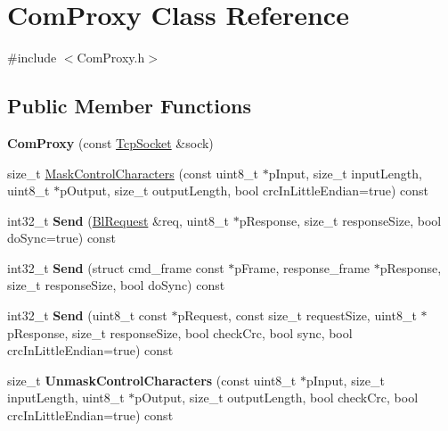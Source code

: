 \hypertarget{class_com_proxy}{\section{Com\-Proxy Class Reference}
\label{class_com_proxy}
}


{\ttfamily \#include $<$Com\-Proxy.\-h$>$}

\subsection*{Public Member Functions}
\begin{DoxyCompactItemize}
\item 
\hypertarget{class_com_proxy_a71069fbcb6901649f75f7b816559e061}{{\bfseries Com\-Proxy} (const \hyperlink{class_tcp_socket}{Tcp\-Socket} \&sock)}\label{class_com_proxy_a71069fbcb6901649f75f7b816559e061}

\item 
size\-\_\-t \hyperlink{class_com_proxy_ada3a89b37980a3e14d3f76341db0c78e}{Mask\-Control\-Characters} (const uint8\-\_\-t $\ast$p\-Input, size\-\_\-t input\-Length, uint8\-\_\-t $\ast$p\-Output, size\-\_\-t output\-Length, bool crc\-In\-Little\-Endian=true) const 
\item 
\hypertarget{class_com_proxy_a58c03dfa5d87cbad6ce77257c5195eb4}{int32\-\_\-t {\bfseries Send} (\hyperlink{struct_bl_request}{Bl\-Request} \&req, uint8\-\_\-t $\ast$p\-Response, size\-\_\-t response\-Size, bool do\-Sync=true) const }\label{class_com_proxy_a58c03dfa5d87cbad6ce77257c5195eb4}

\item 
\hypertarget{class_com_proxy_ab6205e7b4fbfcce8066e3019f5b52fb0}{int32\-\_\-t {\bfseries Send} (struct cmd\-\_\-frame const $\ast$p\-Frame, response\-\_\-frame $\ast$p\-Response, size\-\_\-t response\-Size, bool do\-Sync) const }\label{class_com_proxy_ab6205e7b4fbfcce8066e3019f5b52fb0}

\item 
\hypertarget{class_com_proxy_a5d07c1c822e4ce825236900a6b15e020}{int32\-\_\-t {\bfseries Send} (uint8\-\_\-t const $\ast$p\-Request, const size\-\_\-t request\-Size, uint8\-\_\-t $\ast$p\-Response, size\-\_\-t response\-Size, bool check\-Crc, bool sync, bool crc\-In\-Little\-Endian=true) const }\label{class_com_proxy_a5d07c1c822e4ce825236900a6b15e020}

\item 
\hypertarget{class_com_proxy_a533dbda1e24b846609c153c7545baba0}{size\-\_\-t {\bfseries Unmask\-Control\-Characters} (const uint8\-\_\-t $\ast$p\-Input, size\-\_\-t input\-Length, uint8\-\_\-t $\ast$p\-Output, size\-\_\-t output\-Length, bool check\-Crc, bool crc\-In\-Little\-Endian=true) const }\label{class_com_proxy_a533dbda1e24b846609c153c7545baba0}

\end{DoxyCompactItemize}


